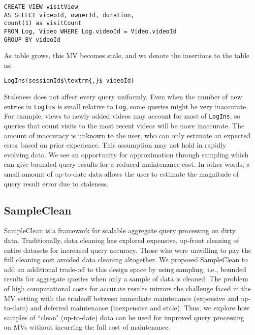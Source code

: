 \vspace{2em}

\begin{lstlisting}[mathescape,basicstyle={\scriptsize}]
CREATE VIEW visitView
AS SELECT videoId, ownerId, duration, 
count(1) as visitCount
FROM Log, Video WHERE Log.videoId = Video.videoId
GROUP BY videoId
\end{lstlisting}
As  table grows, this MV becomes stale, and we denote the insertions to the table as:
\begin{lstlisting}[mathescape,basicstyle={\scriptsize}]
LogIns(sessionId$\textrm{,}$ videoId)
\end{lstlisting}

Staleness does not affect every query uniformly.
Even when the number of new entries in \texttt{LogIns} is small relative to \texttt{Log}, some queries might be very inaccurate.
For example, views to newly added videos may account for most of \texttt{LogIns}, so queries that count visits to the most recent videos will be more inaccurate.
The amount of inaccuracy is unknown to the user, who can only estimate an expected error based on prior experience.
This assumption may not hold in rapidly evolving data.
We see an opportunity for approximation through sampling which can give bounded query results for a reduced maintenance cost.
In other words, a small amount of up-to-date data allows the user to estimate the magnitude of query result error due to staleness.

\subsection{SampleClean~\cite{wang1999sample}}
SampleClean is a framework for scalable aggregate query processing on dirty data.
Traditionally, data cleaning has explored expensive, up-front cleaning of entire datasets for increased query accuracy.
Those who were unwilling to pay the full cleaning cost avoided data cleaning altogether.
We proposed SampleClean to add an additional trade-off to this design space by using sampling, i.e., bounded results for aggregate queries when only a sample of data is cleaned.
The problem of high computational costs for accurate results mirrors the challenge faced in the MV setting with the tradeoff between immediate maintenance (expensive and up-to-date) and deferred maintenance (inexpensive and stale). 
Thus, we explore how samples of ``clean" (up-to-date) data can be used for improved query processing on MVs without incurring the full cost of maintenance.

